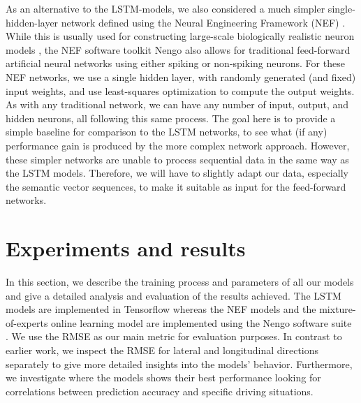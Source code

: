 As an alternative to the \ac{LSTM}-models, we also considered a much simpler single-hidden-layer network defined using the Neural Engineering Framework (\ac{NEF}) \cite{Eliasmith2003}.
While this is usually used for constructing large-scale biologically realistic neuron models \cite{Eliasmith2012}, the \ac{NEF} software toolkit \acs{Nengo} \cite{Bekolay2014} also allows for traditional feed-forward artificial neural networks using either spiking or non-spiking neurons.
For these \ac{NEF} networks, we use a single hidden layer, with randomly generated (and fixed) input weights, and use least-squares optimization to compute the output weights.
As with any traditional network, we can have any number of input, output, and hidden neurons, all following this same process.
The goal here is to provide a simple baseline for comparison to the \ac{LSTM} networks, to see what (if any) performance gain is produced by the more complex network approach.
However, these simpler networks are unable to process sequential data in the same way as the \ac{LSTM} models.
Therefore, we will have to slightly adapt our data, especially the semantic vector sequences, to make it suitable as input for the feed-forward networks.

\section{Experiments and results}
\label{sec:experiments}
In this section, we describe the training process and parameters of all our models and give a detailed analysis and evaluation of the results achieved.
The \ac{LSTM} models are implemented in Tensorflow \cite{Abadi2016} whereas the \ac{NEF} models and the mixture-of-experts online learning model are implemented using the \acs{Nengo} software suite \cite{Bekolay2014}.
We use the \ac{RMSE} as our main metric for evaluation purposes.
In contrast to earlier work, we inspect the \ac{RMSE} for lateral and longitudinal directions separately to give more detailed insights into the models' behavior.
Furthermore, we investigate where the models shows their best performance looking for correlations between prediction accuracy and specific driving situations.

